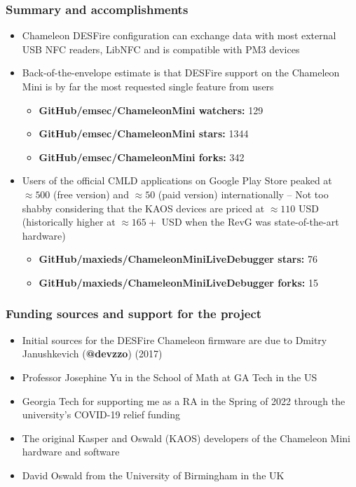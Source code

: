 \documentclass[usenames,svgnames,dvipsnames,11pt]{beamer}
\begin{document}
\begin{frame}
\frametitle{Summary and accomplishments}

\begin{itemize} 

\item Chameleon DESFire configuration can exchange data with most external 
      USB NFC readers, LibNFC and is compatible with PM3 devices
\item Back-of-the-envelope estimate is that DESFire support on the Chameleon Mini is by far the 
      most requested single feature from users \\ 
      \begin{itemize}
      \item \textbf{GitHub/emsec/ChameleonMini watchers:} 129
      \item \textbf{GitHub/emsec/ChameleonMini stars:} 1344
      \item \textbf{GitHub/emsec/ChameleonMini forks:} 342
      \end{itemize}
\item Users of the official CMLD applications on Google Play Store peaked at 
      $\approx 500$ (free version) and $\approx 50$ (paid version) internationally -- 
      Not too shabby considering 
      that the KAOS devices are priced at $\approx 110$ USD 
      (historically higher at $\approx 165+$ USD when the RevG was state-of-the-art hardware)
      \begin{itemize}
      \item \textbf{GitHub/maxieds/ChameleonMiniLiveDebugger stars:} 76
      \item \textbf{GitHub/maxieds/ChameleonMiniLiveDebugger forks:} 15
      \end{itemize}

\end{itemize} 

\end{frame}

\begin{frame}
\frametitle{Funding sources and support for the project}

\begin{itemize} 

\item Initial sources for the DESFire Chameleon firmware are due to 
      Dmitry Janushkevich (\textbf{@devzzo}) (2017)
\item Professor Josephine Yu in the School of Math at GA Tech in the US
\item Georgia Tech for supporting me as a RA in the Spring of 2022 through the university's 
      COVID-19 relief funding 
\item The original Kasper and Oswald (KAOS) developers of the Chameleon Mini hardware and software 
\item David Oswald from the University of Birmingham in the UK

\end{itemize} 

\end{frame}
\end{document}
